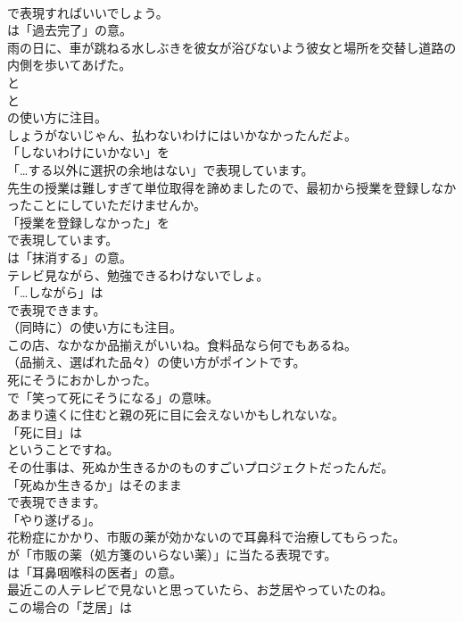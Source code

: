 \documentclass[8pt]{extreport}
\begin{document}
\begin{CJK}{UTF8}{min}
\\	で表現すればいいでしょう。
\\	は「過去完了」の意。	
\\	雨の日に、車が跳ねる水しぶきを彼女が浴びないよう彼女と場所を交替し道路の内側を歩いてあげた。 
\\	と 
\\	と 
\\	の使い方に注目。	
\\	しょうがないじゃん、払わないわけにはいかなかったんだよ。 
\\	「しないわけにいかない」を 
\\	「…する以外に選択の余地はない」で表現しています。	
\\	先生の授業は難しすぎて単位取得を諦めましたので、最初から授業を登録しなかったことにしていただけませんか。 
\\	「授業を登録しなかった」を 
\\	で表現しています。
\\	は「抹消する」の意。	
\\	テレビ見ながら、勉強できるわけないでしょ。 
\\	「…しながら」は
\\	で表現できます。
\\	（同時に）の使い方にも注目。	
\\	この店、なかなか品揃えがいいね。食料品なら何でもあるね。 
\\	（品揃え、選ばれた品々）の使い方がポイントです。	
\\	死にそうにおかしかった。 
\\	で「笑って死にそうになる」の意味。	
\\	あまり遠くに住むと親の死に目に会えないかもしれないな。 
\\	「死に目」は
\\	ということですね。	
\\	その仕事は、死ぬか生きるかのものすごいプロジェクトだったんだ。 
\\	「死ぬか生きるか」はそのまま
\\	で表現できます。
\\	「やり遂げる」。	
\\	花粉症にかかり、市販の薬が効かないので耳鼻科で治療してもらった。 
\\	が「市販の薬（処方箋のいらない薬）」に当たる表現です。
\\	は「耳鼻咽喉科の医者」の意。	
\\	最近この人テレビで見ないと思っていたら、お芝居やっていたのね。 
\\	この場合の「芝居」は

\end{CJK}
\end{document}
